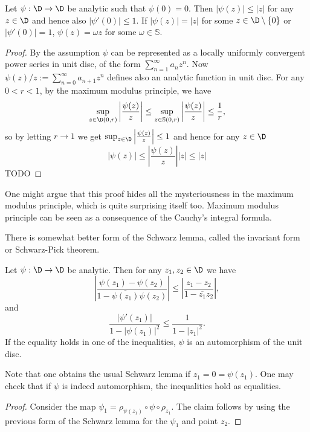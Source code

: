 \begin{lause}
	Let $\psi : \D \to \D$ be analytic such that $\psi(0) = 0$. Then $|\psi(z)| \leq |z|$ for any $z \in \D$ and hence also $|\psi'(0)| \leq 1$. If $|\psi(z)| = |z|$ for some $z \in \D \setminus \{0\}$ or $|\psi'(0)| = 1$, $\psi(z) = \omega z$ for some $\omega \in \mathbb{S}$.
\end{lause}
\begin{proof}
	By the assumption $\psi$ can be represented as a locally uniformly convergent power series in unit disc, of the form $\sum_{n = 1}^{\infty}a_{n} z^{n}$. Now $\psi(z)/z := \sum_{n = 0}^{\infty} a_{n + 1} z^{n}$ defines also an analytic function in unit disc. For any $0 < r < 1$, by the maximum modulus principle, we have
	\[
		\sup_{z \in \D(0, r)} \left|\frac{\psi(z)}{z}\right| \leq \sup_{z \in \mathbb{S}(0, r)} \left|\frac{\psi(z)}{z}\right| \leq \frac{1}{r},
	\]
	so by letting $r \to 1$ we get $\sup_{z \in \D} \left|\frac{\psi(z)}{z}\right| \leq 1$ and hence for any $z \in \D$
	\[
		|\psi(z)| \leq \left|\frac{\psi(z)}{z}\right| |z| \leq |z|
	\]
	TODO
\end{proof}

One might argue that this proof hides all the mysteriousness in the maximum modulus principle, which is quite surprising itself too. Maximum modulus principle can be seen as a consequence of the Cauchy's integral formula.

There is somewhat better form of the Schwarz lemma, called the invariant form or Schwarz-Pick theorem.

\begin{lause}
	Let $\psi : \D \to \D$ be analytic. Then for any $z_{1}, z_{2} \in \D$ we have
	\[
		\left|\frac{\psi(z_{1}) - \psi(z_{2})}{1 - \overline{\psi(z_{1})} \psi(z_{2})} \right| \leq \left|\frac{z_{1} - z_{2}}{1 - \overline{z_{1}}z_{2}}\right|,
	\]
	and
	\[
		\frac{\left|\psi'(z_{1})\right|}{1 - |\psi(z_{1})|^2} \leq \frac{1}{1 - |z_{1}|^2}.
	\]
	If the equality holds in one of the inequalities, $\psi$ is an automorphism of the unit disc. 
\end{lause}

Note that one obtains the usual Schwarz lemma if $z_{1} = 0 = \psi(z_{1})$. One may check that if $\psi$ is indeed automorphism, the inequalities hold as equalities.
\begin{proof}
	Consider the map $\psi_{1} = \rho_{\psi(z_{1})} \circ \psi \circ \rho_{z_{1}}$. The claim follows by using the previous form of the Schwarz lemma for the $\psi_{1}$ and point $z_{2}$.
\end{proof}

